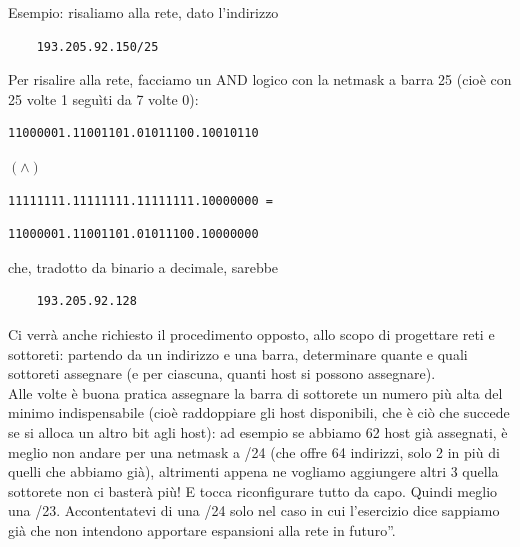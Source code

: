 \noindent Esempio: risaliamo alla rete, dato l'indirizzo\begin{verbatim}
    193.205.92.150/25
\end{verbatim}

\noindent Per risalire alla rete, facciamo un AND logico con la netmask a barra 25 (cioè con 25 volte 1 seguìti da 7 volte 0):
\begin{verbatim}
11000001.11001101.01011100.10010110
\end{verbatim}
$(\land)$
\begin{verbatim}
11111111.11111111.11111111.10000000 =
\end{verbatim}

\begin{verbatim}
11000001.11001101.01011100.10000000
\end{verbatim}
che, tradotto da binario a decimale, sarebbe\begin{verbatim}
    193.205.92.128
\end{verbatim}

\noindent Ci verrà anche richiesto il procedimento opposto, allo scopo di progettare reti e sottoreti: partendo da un indirizzo e una barra, determinare quante e quali sottoreti assegnare (e per ciascuna, quanti host si possono assegnare).\\

\noindent Alle volte è buona pratica assegnare la barra di sottorete un numero più alta del minimo indispensabile (cioè raddoppiare gli host disponibili, che è ciò che succede se si alloca un altro bit agli host): ad esempio se abbiamo 62 host già assegnati, è meglio non andare per una netmask a /24 (che offre 64 indirizzi, solo 2 in più di quelli che abbiamo già), altrimenti appena ne vogliamo aggiungere altri 3 quella sottorete non ci basterà più! E tocca riconfigurare tutto da capo. Quindi meglio una /23. Accontentatevi di una /24 solo nel caso in cui l'esercizio dice \openapex sappiamo già che non intendono apportare espansioni alla rete in futuro''.